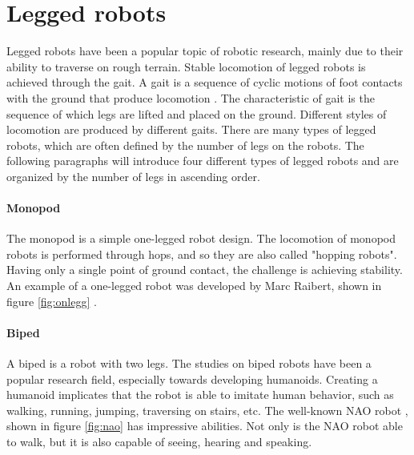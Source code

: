 \documentclass[USenglish]{ifimaster}  %
\begin{document}
\section{Legged robots}
Legged robots have been a popular topic of robotic research, mainly due to their ability to traverse on rough terrain. Stable locomotion of legged robots is achieved through the gait. A gait is a sequence of cyclic motions of foot contacts with the ground that produce locomotion \cite{1641859}. The characteristic of gait is the sequence of which legs are lifted and placed on the ground. Different styles of locomotion are produced by different gaits. There are many types of legged robots, which are often defined by the number of legs on the robots. The following paragraphs will introduce four different types of legged robots and are organized by the number of legs in ascending order.




\paragraph{Monopod}
The monopod is a simple one-legged robot design. The locomotion of  monopod robots is performed through hops, and so they are also called "hopping robots". Having only a single point of ground contact, the challenge is achieving stability. An example of a one-legged robot was developed by Marc Raibert, shown in figure \ref{fig:onlegg} \cite{Raibert:1986:LR:5948.5950}.

\paragraph{Biped}
A biped is a robot with two legs. The studies on biped robots have been a popular research field, especially towards developing humanoids. Creating a humanoid implicates that the robot is able to imitate human behavior, such as walking, running, jumping, traversing on stairs, etc. The well-known NAO robot \cite{NAO}, shown in figure \ref{fig:nao} has impressive abilities. Not only is the NAO robot able to walk, but it is also capable of seeing, hearing and speaking. 
\end{document}

